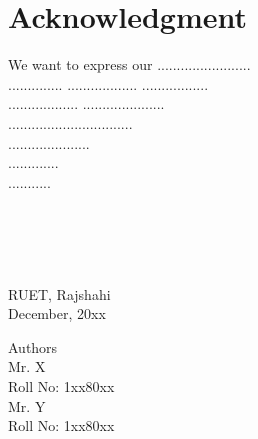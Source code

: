 
\chapter*{Acknowledgment}

We want to express our ........................\\

..............
..................
.................\\

..................
.....................
\\

................................\\


.....................\\   .............\\ ...........\\
\\
\\
\\
\\



 
\begin{minipage}[t]{0.4\textwidth}
\begin{flushleft} \large
RUET, Rajshahi\\
December, 20xx
\end{flushleft}
\end{minipage}
\begin{minipage}[t]{0.5\textwidth}
\begin{flushright} \large
Authors\\
Mr. X\\
Roll No: 1xx80xx\\
Mr. Y\\
Roll No: 1xx80xx\\
\end{flushright}
\end{minipage}\\[3cm]
 
\vfill